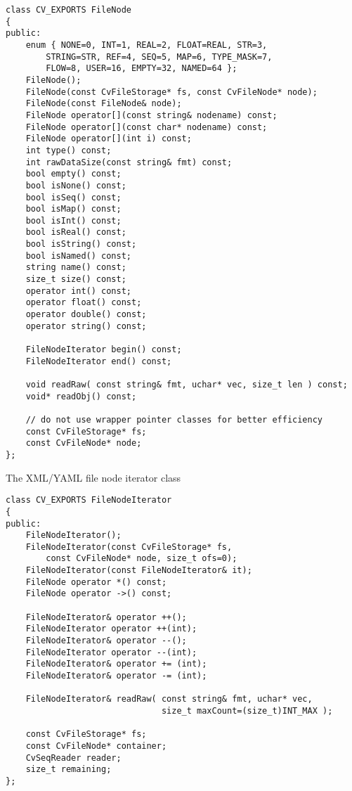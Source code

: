 \begin{lstlisting}
class CV_EXPORTS FileNode
{
public:
    enum { NONE=0, INT=1, REAL=2, FLOAT=REAL, STR=3,
        STRING=STR, REF=4, SEQ=5, MAP=6, TYPE_MASK=7,
        FLOW=8, USER=16, EMPTY=32, NAMED=64 };
    FileNode();
    FileNode(const CvFileStorage* fs, const CvFileNode* node);
    FileNode(const FileNode& node);
    FileNode operator[](const string& nodename) const;
    FileNode operator[](const char* nodename) const;
    FileNode operator[](int i) const;
    int type() const;
    int rawDataSize(const string& fmt) const;
    bool empty() const;
    bool isNone() const;
    bool isSeq() const;
    bool isMap() const;
    bool isInt() const;
    bool isReal() const;
    bool isString() const;
    bool isNamed() const;
    string name() const;
    size_t size() const;
    operator int() const;
    operator float() const;
    operator double() const;
    operator string() const;

    FileNodeIterator begin() const;
    FileNodeIterator end() const;

    void readRaw( const string& fmt, uchar* vec, size_t len ) const;
    void* readObj() const;

    // do not use wrapper pointer classes for better efficiency
    const CvFileStorage* fs;
    const CvFileNode* node;
};
\end{lstlisting}

The XML/YAML file node iterator class

\begin{lstlisting}
class CV_EXPORTS FileNodeIterator
{
public:
    FileNodeIterator();
    FileNodeIterator(const CvFileStorage* fs,
        const CvFileNode* node, size_t ofs=0);
    FileNodeIterator(const FileNodeIterator& it);
    FileNode operator *() const;
    FileNode operator ->() const;

    FileNodeIterator& operator ++();
    FileNodeIterator operator ++(int);
    FileNodeIterator& operator --();
    FileNodeIterator operator --(int);
    FileNodeIterator& operator += (int);
    FileNodeIterator& operator -= (int);

    FileNodeIterator& readRaw( const string& fmt, uchar* vec,
                               size_t maxCount=(size_t)INT_MAX );

    const CvFileStorage* fs;
    const CvFileNode* container;
    CvSeqReader reader;
    size_t remaining;
};
\end{lstlisting}

\fi

